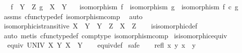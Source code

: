 \begin{isabellebody}
\ \ \ {\isachardoublequoteopen}f\ {\isacharcolon}{\kern0pt}\ Y\ {\isasymrightarrow}\ Z{\isachardoublequoteclose}\ {\isachardoublequoteopen}g\ {\isacharcolon}{\kern0pt}\ X\ {\isasymrightarrow}\ Y{\isachardoublequoteclose}\isanewline
\ \ \ {\isachardoublequoteopen}isomorphism\ f\ {\isasymLongrightarrow}\ isomorphism\ g\ {\isasymLongrightarrow}\ isomorphism\ {\isacharparenleft}{\kern0pt}f\ {\isasymcirc}\isactrlsub c\ g{\isacharparenright}{\kern0pt}{\isachardoublequoteclose}\isanewline
%
\isadelimproof
\ \ %
\endisadelimproof
%
\isatagproof
{}\isamarkupfalse%
\ assms\ cfunc{\isacharunderscore}{\kern0pt}type{\isacharunderscore}{\kern0pt}def\ isomorphism{\isacharunderscore}{\kern0pt}comp\ \isamarkupfalse%
\ auto%
\endisatagproof
{\isafoldproof}%
%
\isadelimproof
\isanewline
%
\endisadelimproof
\isanewline
{}\isamarkupfalse%
\ isomorphic{\isacharunderscore}{\kern0pt}is{\isacharunderscore}{\kern0pt}transitive{\isacharcolon}{\kern0pt}\ {\isachardoublequoteopen}{\isacharparenleft}{\kern0pt}X\ {\isasymcong}\ Y\ {\isasymand}\ Y\ {\isasymcong}\ Z{\isacharparenright}{\kern0pt}\ {\isasymlongrightarrow}\ X\ {\isasymcong}\ Z{\isachardoublequoteclose}\isanewline
%
\isadelimproof
\ \ %
\endisadelimproof
%
\isatagproof
{}\isamarkupfalse%
\ is{\isacharunderscore}{\kern0pt}isomorphic{\isacharunderscore}{\kern0pt}def\ \isamarkupfalse%
\ {\isacharparenleft}{\kern0pt}auto{\isacharcomma}{\kern0pt}\ metis\ cfunc{\isacharunderscore}{\kern0pt}type{\isacharunderscore}{\kern0pt}def\ comp{\isacharunderscore}{\kern0pt}type\ isomorphism{\isacharunderscore}{\kern0pt}comp{\isacharparenright}{\kern0pt}%
\endisatagproof
{\isafoldproof}%
%
\isadelimproof
\isanewline
%
\endisadelimproof
\isanewline
{}\isamarkupfalse%
\ is{\isacharunderscore}{\kern0pt}isomorphic{\isacharunderscore}{\kern0pt}equiv{\isacharcolon}{\kern0pt}\isanewline
\ \ {\isachardoublequoteopen}equiv\ UNIV\ {\isacharbraceleft}{\kern0pt}{\isacharparenleft}{\kern0pt}X{\isacharcomma}{\kern0pt}\ Y{\isacharparenright}{\kern0pt}{\isachardot}{\kern0pt}\ X\ {\isasymcong}\ Y{\isacharbraceright}{\kern0pt}{\isachardoublequoteclose}\isanewline
%
\isadelimproof
\ \ %
\endisadelimproof
%
\isatagproof
{}\isamarkupfalse%
\ equiv{\isacharunderscore}{\kern0pt}def\isanewline
{}\isamarkupfalse%
\ safe\isanewline
\ \ \isamarkupfalse%
\ {\isachardoublequoteopen}refl\ {\isacharbraceleft}{\kern0pt}{\isacharparenleft}{\kern0pt}x{\isacharcomma}{\kern0pt}\ y{\isacharparenright}{\kern0pt}{\isachardot}{\kern0pt}\ x\ {\isasymcong}\ y{\isacharbraceright}{\kern0pt}{\isachardoublequoteclose}\isanewline

\end{isabellebody}
